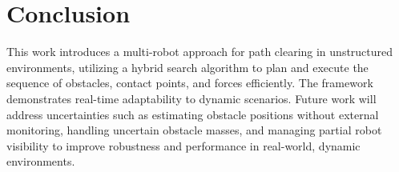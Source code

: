 \section{Conclusion} \label{sec:conclusion}
This work introduces a multi-robot approach for path clearing in unstructured environments, utilizing
a hybrid search algorithm to plan and execute the sequence of obstacles, contact points, and forces efficiently.
The framework demonstrates real-time adaptability to dynamic scenarios. Future work will address uncertainties
such as estimating obstacle positions without external monitoring, handling uncertain obstacle masses, and managing
partial robot visibility to improve robustness and performance in real-world, dynamic environments.
